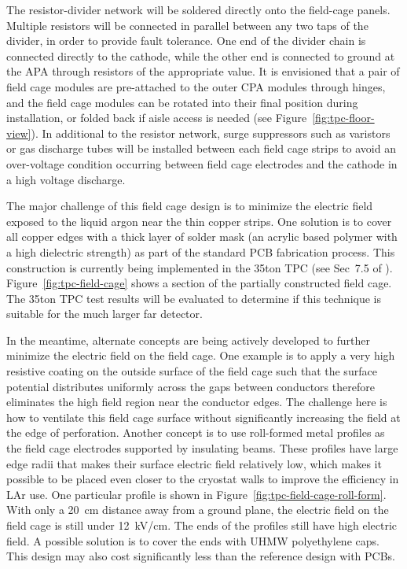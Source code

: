 The resistor-divider network will be soldered directly onto the field-cage panels. Multiple resistors will be connected in parallel between any two taps of the divider,
in order to provide fault tolerance. One end of the divider chain is connected directly to the cathode, while the other end is connected to ground at the APA through resistors of the appropriate value.  It is envisioned that a pair of field cage modules are pre-attached to the outer CPA modules through hinges, and the field cage modules can be rotated into their final position during installation, or folded back if aisle access is needed (see Figure~\ref{fig:tpc-floor-view}). 
In additional to the resistor network, surge suppressors such as varistors or gas discharge tubes will be installed between each field cage strips to avoid an over-voltage condition occurring between field cage electrodes and the cathode in a high voltage discharge.

The major challenge of this field cage design is to minimize the electric field exposed to the liquid argon near the thin copper strips.  One solution is to cover all copper edges with a thick layer of solder mask (an acrylic based polymer with a high dielectric strength) as part of the standard PCB fabrication process.  This construction is currently being implemented in the 35ton TPC (see Sec~7.5 of \anxlbnefd).  Figure~\ref{fig:tpc-field-cage} shows a section of the partially constructed field cage.  The 35ton TPC test results will be evaluated to determine if this technique is suitable for the much larger far detector. 
 
In the meantime, alternate concepts are being actively developed to further minimize the electric field on the field cage.  One example is to apply a very high resistive coating on the outside surface of the field cage such that the surface potential distributes uniformly across the gaps between conductors therefore eliminates the high field region near the conductor edges.  The challenge here is how to ventilate this field cage surface without significantly increasing the field at the edge of perforation.  Another concept is to use roll-formed metal profiles as the field cage electrodes supported by insulating beams.  These profiles have large edge radii that makes their surface electric field relatively low, which makes it possible to be placed even closer to the cryostat walls to improve the efficiency in LAr use.  One particular profile is shown in Figure~\ref{fig:tpc-field-cage-roll-form}.  With only a 20~cm distance away from a ground plane, the electric field on the field cage is still under 12~kV/cm.  The ends of the profiles still have high electric field.  A possible solution is to cover the ends with UHMW polyethylene caps.  This design may also cost significantly less than the reference design with PCBs.

